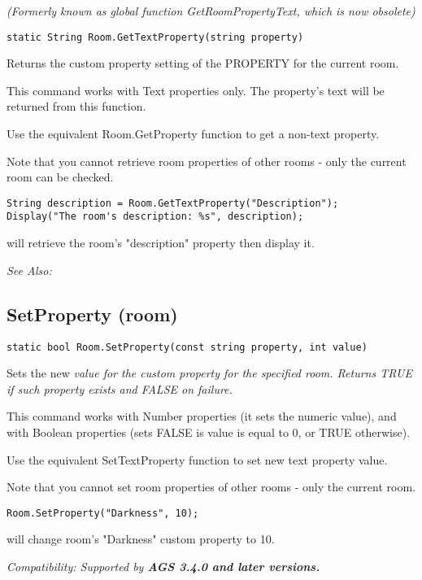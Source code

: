 \it{(Formerly known as global function GetRoomPropertyText, which is now obsolete)}

\begin{verbatim}
static String Room.GetTextProperty(string property)
\end{verbatim}
Returns the custom property setting of the PROPERTY for the current room.

This command works with Text properties only. The property's text will be
returned from this function.

Use the equivalent Room.GetProperty function to get a non-text property.

Note that you cannot retrieve room properties of other rooms - only the current room
can be checked.

\begin{verbatim}
String description = Room.GetTextProperty("Description");
Display("The room's description: %s", description);
\end{verbatim}
will retrieve the room's "description" property then display it.

\it{See Also:} 


\subsection{SetProperty (room)}\label{Room.SetProperty}%

\begin{verbatim}
static bool Room.SetProperty(const string property, int value)
\end{verbatim}
Sets the new \it{value} for the custom \it{property} for the specified room. Returns
TRUE if such property exists and FALSE on failure.

This command works with Number properties (it sets the numeric value), and with Boolean
properties (sets FALSE is value is equal to 0, or TRUE otherwise).

Use the equivalent SetTextProperty function to set new text property value.

Note that you cannot set room properties of other rooms - only the current room.

\begin{verbatim}
Room.SetProperty("Darkness", 10);
\end{verbatim}
will change room's "Darkness" custom property to 10.

\it{Compatibility:} Supported by \bf{AGS 3.4.0} and later versions.

